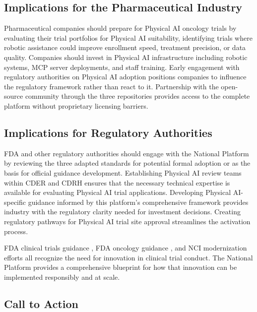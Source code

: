 \subsection{Implications for the Pharmaceutical Industry}
\label{subsec:conclusion-pharma}

Pharmaceutical companies should prepare for Physical AI oncology trials by
evaluating their trial portfolios for Physical AI suitability, identifying
trials where robotic assistance could improve enrollment speed, treatment
precision, or data quality. Companies should invest in Physical AI
infrastructure including robotic systems, MCP server deployments, and staff
training. Early engagement with regulatory authorities on Physical AI adoption
positions companies to influence the regulatory framework rather than react to
it. Partnership with the open-source community through the three repositories
\cite{main-repo, mcp-repo, fl-repo} provides access to the complete platform
without proprietary licensing barriers.

\subsection{Implications for Regulatory Authorities}
\label{subsec:conclusion-regulatory}

FDA and other regulatory authorities should engage with the National Platform by
reviewing the three adapted standards for potential formal adoption or as the
basis for official guidance development. Establishing Physical AI review teams
within CDER and CDRH ensures that the necessary technical expertise is available
for evaluating Physical AI trial applications. Developing Physical AI-specific
guidance informed by this platform's comprehensive framework provides industry
with the regulatory clarity needed for investment decisions. Creating regulatory
pathways for Physical AI trial site approval streamlines the activation process.

FDA clinical trials guidance \cite{fda-clinical-trials-guidance}, FDA oncology
guidance \cite{fda-oncology-guidance}, and NCI modernization efforts
\cite{nci-modernizing} all recognize the need for innovation in clinical trial
conduct. The National Platform provides a comprehensive blueprint for how that
innovation can be implemented responsibly and at scale.

\subsection{Call to Action}
\label{subsec:conclusion-action}

